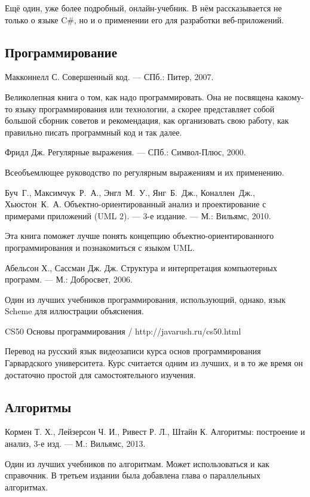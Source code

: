 \begin{thebibliography}{99}
  Ещё один, уже более подробный, онлайн-учебник. В нём рассказывается
  не только о языке C\#, но и о применении его для разработки
  веб-приложений.

  \subsection*{Программирование}

  Макконнелл С. Совершенный код. — СПб.: Питер, 2007.

  Великолепная книга о том, как надо программировать. Она не посвящена
  какому-то языку программирования или технологии, а скорее
  представляет собой большой сборник советов и рекомендация, как
  организовать свою работу, как правильно писать программный код и так
  далее.

  Фридл Дж. Регулярные выражения. — СПб.: Символ-Плюс, 2000.

  Всеобъемлющее руководство по регулярным выражениям и их применению.

  Буч~Г., Максимчук~Р.~А., Энгл~М.~У., Янг~Б.~Дж., Коналлен~Дж.,
  Хьюстон~К.~А. Объектно-ориентированный анализ и проектирование с
  примерами приложений (UML 2). — 3-е издание. — М.: Вильямс, 2010.

  Эта книга поможет лучше понять концепцию объектно-ориентированного
  программирования и познакомиться с языком UML.

  Абельсон Х., Сассман Дж. Дж. Структура и интерпретация компьютерных программ. — М.: Добросвет, 2006.

  Один из лучших учебников программирования, использующий, однако,
  язык Scheme для иллюстрации объяснения.

  CS50 Основы программирования / http://javarush.ru/cs50.html

  Перевод на русский язык видеозаписи курса основ программирования
  Гарвардского университета.  Курс считается одним из лучших, и в то
  же время он достаточно простой для самостоятельного изучения.

  \subsection*{Алгоритмы}
  
  Кормен Т. Х., Лейзерсон Ч. И., Ривест Р. Л., Штайн К. Алгоритмы: построение и анализ, 3-е изд. — М.: Вильямс, 2013.
  
  Один из лучших учебников по алгоритмам. Может использоваться и как
  справочник. В третьем издании была добавлена глава о параллельных
  алгоритмах.
  

\end{thebibliography}
